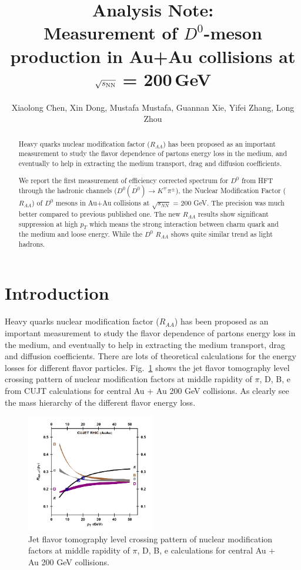 \documentclass[a4paper]{article}
\title{Analysis Note: \\
Measurement of $D^0$-meson production in Au+Au collisions at $\sqrt{s_{\rm NN}}$ = 200\,GeV}
\author{Xiaolong Chen, Xin Dong, Mustafa Mustafa, Guannan Xie, Yifei Zhang, Long Zhou}
\begin{document}
\maketitle

\begin{abstract}
Heavy quarks nuclear modification factor ($R_{AA}$) has been proposed as an important measurement to study the flavor dependence of partons energy loss in the medium, and eventually to help in extracting the medium transport, drag and diffusion coefficients.

We report the first measurement of efficiency corrected spectrum for $D^0$ from HFT through the hadronic channels ($D^0(\bar{D^0}) \rightarrow K^{\mp}\pi^{\pm}$), the Nuclear Modification Factor ($R_{AA}$) of $D^0$ mesons in Au+Au collisions at $\sqrt{s_{NN}}$ = 200 GeV. The precision was much better compared to previous published one. The new $R_{AA}$ results show significant suppression at high $p_T$ which means the strong interaction between charm quark and the medium and loose energy. While the $D^0$ $R_{AA}$ shows quite similar trend as light hadrons.
\end{abstract}

\section{Introduction}

Heavy quarks nuclear modification factor ($R_{AA}$) has been proposed as an important measurement to study the flavor dependence of partons energy loss in the medium, and eventually to help in extracting the medium transport, drag and diffusion coefficients. There are lots of theoretical calculations for the energy losses for different flavor particles. Fig.~\ref{fig:raa_CUJE} shows the jet flavor tomography level crossing pattern of nuclear modification factors at middle rapidity of $\pi$, D, B, e from CUJT calculations for central Au + Au 200 GeV collisions. As clearly see the mass hierarchy of the different flavor energy loss.

\begin{figure}
\centering
\includegraphics[width=0.5\textwidth]{fig/raa_CUJE.png}
\caption{Jet flavor tomography level crossing pattern of nuclear modification factors at middle rapidity of $\pi$, D, B, e calculations for central Au + Au 200 GeV collisions.}
\label{fig:raa_CUJE} 
\end{figure}
\end{document}
